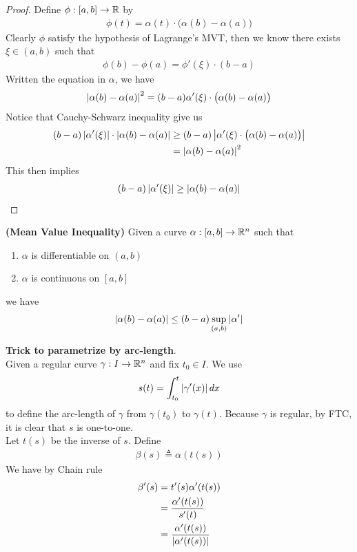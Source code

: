 \documentclass{report}
\begin{document}
\begin{proof}
Define $\phi:[a,b]\rightarrow \mathbb{R}$ by 
\begin{align*}
\phi(t)=\alpha (t)\cdot \big(\alpha (b)-\alpha (a) \big) 
\end{align*}
Clearly $\phi$ satisfy the hypothesis of Lagrange's MVT, then we know there exists $\xi \in (a,b)$ such that 
\begin{align*}
\phi(b)-\phi (a)=\phi'(\xi )\cdot (b-a)
\end{align*}
Written the equation in $\alpha $, we have 
\begin{align*}
\left|\alpha (b)-\alpha (a)\right|^2= (b-a)\alpha '(\xi)\cdot \big(\alpha (b)-\alpha (a) \big)
\end{align*}
Notice that Cauchy-Schwarz inequality give us 
\begin{align*}
  (b-a)\left|\alpha '(\xi)\right|\cdot \left|\alpha (b)-\alpha (a)\right|&\geq (b-a)\left|\alpha ' (\xi)\cdot \big(\alpha (b)-\alpha (a) \big)\right| \\
  &=\left|\alpha (b)-\alpha (a)\right|^2
\end{align*}
This then implies 
\begin{align*}
  (b-a)\left|\alpha '(\xi)\right|\geq \left|\alpha (b)-\alpha (a)\right|
\end{align*}
\end{proof}
\begin{corollary}
\label{MVI}
\textbf{(Mean Value Inequality)} Given a curve $\alpha :[a,b]\rightarrow \mathbb{R}^n$ such that 
\begin{enumerate}[label=(\alph*)]
  \item $\alpha $ is differentiable on $(a,b)$ 
  \item $\alpha $ is continuous on $[a,b]$
\end{enumerate}
we have 
\begin{align*}
\left|\alpha (b)-\alpha (a)\right|\leq (b-a)\sup_{(a,b)}\left|\alpha '\right|
\end{align*}
\end{corollary}
\begin{mdframed}
\textbf{Trick to parametrize by arc-length}.\\

Given a regular curve $\gamma :I\rightarrow \mathbb{R}^n$ and fix $t_0 \in I$. We use
\begin{align*}
  s(t)=\int_{t_0}^t \left|\gamma  ' (x)\right|dx
\end{align*}
to define the arc-length of  $\gamma $ from $\gamma (t_0)$ to $\gamma (t)$. Because $\gamma $ is regular, by FTC, it is clear that $s$ is one-to-one.\\

Let $t(s)$ be the inverse of $s$. Define 
 \begin{align*}
\beta (s)\triangleq \alpha (t(s))
\end{align*}
We have by Chain rule 
\begin{align*}
\beta '(s)&=t'(s)\alpha '(t(s))\\
&=\frac{\alpha '(t(s))}{s'(t)}\\
&=\frac{\alpha '(t(s))}{\left|\alpha '(t(s))\right|}
\end{align*}
\end{mdframed} 
\end{document}
